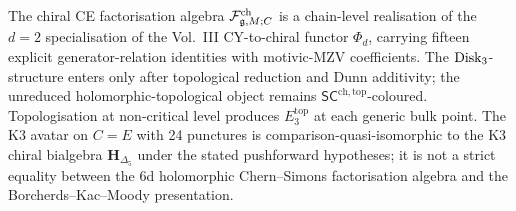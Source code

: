 \begin{remark}
\label{rem:ch-ce-comparison-summary}
%
The chiral CE factorisation algebra $\mathcal{F}^{\mathrm{ch}}_{\mathfrak{g},M;C}$ is a
chain-level realisation of the \(d=2\) specialisation of the Vol.~III
CY-to-chiral functor \(\Phi_d\), carrying fifteen explicit
generator-relation identities with motivic-MZV coefficients. The
$\mathrm{Disk}_3$-structure enters only after topological reduction and Dunn
additivity; the unreduced holomorphic-topological object remains
$\mathsf{SC}^{\mathrm{ch,top}}$-coloured. Topologisation at
non-critical level produces $E_3^{\mathrm{top}}$ at each generic bulk
point. The K3 avatar on $C = E$ with 24 punctures is
comparison-quasi-isomorphic to the K3 chiral bialgebra
$\mathbf H_{\Delta_5}$ under the stated pushforward hypotheses; it is
not a strict equality between the 6d holomorphic Chern--Simons
factorisation algebra and the Borcherds--Kac--Moody presentation.
\end{remark}
